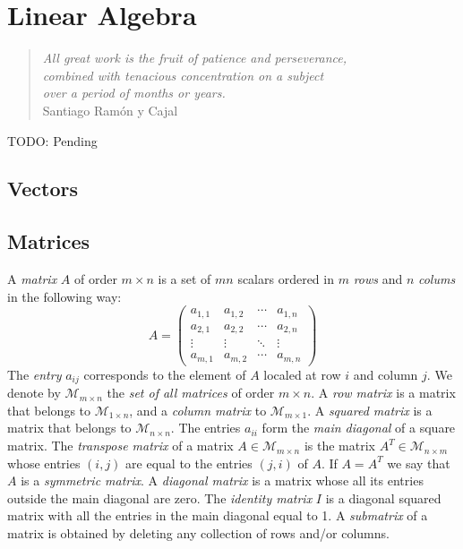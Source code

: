 %
%


\chapter{Linear Algebra}

\begin{quote}
    \begin{flushright}
        \emph{All great work is the fruit of patience and perseverance,\\
            combined with tenacious concentration on a subject\\
            over a period of months or years.}\\
        Santiago Ramón y Cajal
    \end{flushright}
\end{quote}
\bigskip

{\color{red} TODO: Pending}

%
%
\section{Vectors}


%
%

\section{Matrices}

A \emph{matrix} $A$ of order $m \times n$ is a set of $mn$ scalars ordered in $m$ \emph{rows} and $n$ \emph{colums} in the following way:
\[
A = 
 \begin{pmatrix}
  a_{1,1} & a_{1,2} & \cdots & a_{1,n} \\
  a_{2,1} & a_{2,2} & \cdots & a_{2,n} \\
  \vdots  & \vdots  & \ddots & \vdots  \\
  a_{m,1} & a_{m,2} & \cdots & a_{m,n} 
 \end{pmatrix}
\]
The \emph{entry} $a_{ij}$ corresponds to the element of $A$ localed at row $i$ and column $j$. We denote by $\mathcal{M}_{m \times n}$ the \emph{set of all matrices} of order $m \times n$. A \emph{row matrix} is a matrix that belongs to $\mathcal{M}_{1 \times n}$, and a \emph{column matrix} to $\mathcal{M}_{m \times 1}$. A \emph{squared matrix} is a matrix that belongs to $\mathcal{M}_{n \times n}$. The entries $a_{ii}$ form the \emph{main diagonal} of a square matrix. The \emph{transpose matrix} of a matrix $A \in \mathcal{M}_{m \times n}$ is the matrix $A^T \in \mathcal{M}_{n \times m}$ whose entries $(i,j)$ are equal to the entries $(j, i)$ of $A$. If $A = A^T$ we say that $A$ is a \emph{symmetric matrix}. A \emph{diagonal matrix} is a matrix whose all its entries outside the main diagonal are zero. The \emph{identity matrix} $I$ is a diagonal squared matrix with all the entries in the main diagonal equal to 1. A \emph{submatrix} of a matrix is obtained by deleting any collection of rows and/or columns.

